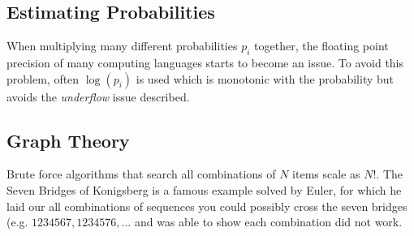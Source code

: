 \subsection{Estimating Probabilities}
When multiplying many different probabilities $p_i$ together, the floating point precision of many computing languages starts to become an issue. To avoid this problem, often $\log(p_i)$ is used which is monotonic with the probability but avoids the \textit{underflow} issue described.

\subsection{Graph Theory}
Brute force algorithms that search all combinations of $N$ items scale as $N!$. The Seven Bridges of Konigsberg is a famous example solved by Euler, for which he laid our all combinations of sequences you could possibly cross the seven bridges (e.g. $1234567, 1234576,...$ and was able to show each combination did not work.


